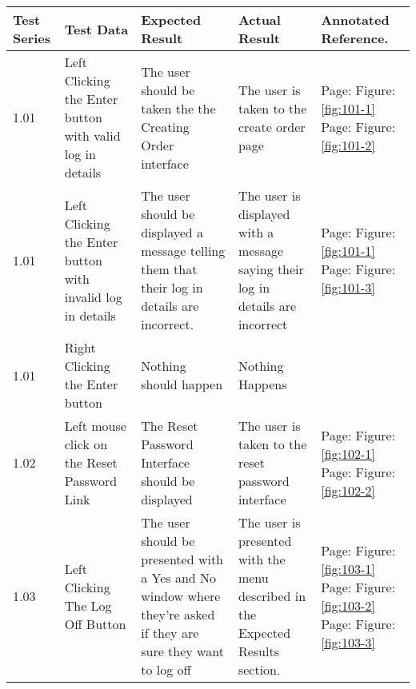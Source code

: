 \begin{flushleft}
    \begin{longtable}{|p{1.0cm}|p{2.5cm}|p{3cm}|p{3.0cm}|p{2.5cm}|}
        \hline
        \textbf{Test Series} & \textbf{Test Data} & \textbf{Expected Result} &  \textbf{Actual Result} &  \textbf{Annotated Reference.}\\ \hline
	1.01 & Left Clicking the Enter button with valid log in details & The user should be taken the the Creating Order interface& The user is taken to the create order page  & Page:\pageref{fig:101-1}  \newline Figure:\ref{fig:101-1}  \newline  \newline Page:\pageref{fig:101-2}  \newline Figure:\ref{fig:101-2} \\ \hline
	1.01 & Left Clicking the Enter button with invalid log in details &The user should be displayed a message telling them that their log in details are incorrect. & The user is displayed with a message saying their log in details are incorrect & Page:\pageref{fig:101-1}  \newline Figure:\ref{fig:101-1} \newline  \newline Page:\pageref{fig:101-3}  \newline Figure:\ref{fig:101-3}\\ \hline
	1.01 & Right Clicking the Enter button & Nothing should happen & Nothing Happens &\\ \hline 
	1.02 & Left mouse click on the Reset Password Link & The Reset Password Interface should be displayed & The user is taken to the reset password interface & Page:\pageref{fig:102-1}  \newline Figure:\ref{fig:102-1} \newline  \newline  Page:\pageref{fig:102-2}  \newline Figure:\ref{fig:102-2}\\ \hline
	1.03 & Left Clicking The Log Off Button & The user should be presented with a Yes and No window where they're asked if they are sure they want to log off& The user is presented with the menu described in the Expected Results section.&  Page:\pageref{fig:103-1}  \newline Figure:\ref{fig:103-1} \newline  \newline  Page:\pageref{fig:103-2}  \newline Figure:\ref{fig:103-2}  \newline  \newline  Page:\pageref{fig:103-3}  \newline Figure:\ref{fig:103-3}\\ \hline

\end{longtable}
\end{flushleft}
